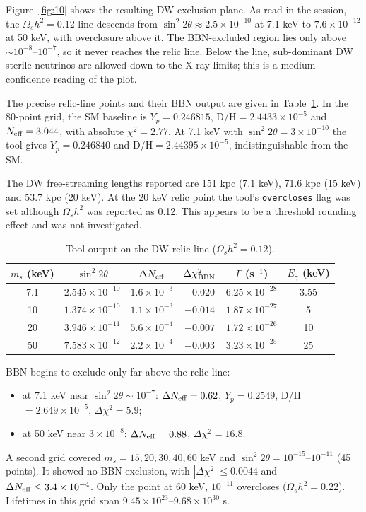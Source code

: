 \documentclass[11pt,a4paper]{article}
\begin{document}
Figure~\ref{fig:10} shows the resulting DW exclusion plane. As read in the session, the $\Omega_s h^2=0.12$ line descends from $\sin^2 2\theta\approx2.5\times10^{-10}$ at 7.1 keV to $7.6\times10^{-12}$ at 50 keV, with overclosure above it. The BBN-excluded region lies only above $\sim10^{-8}$--$10^{-7}$, so it never reaches the relic line. Below the line, sub-dominant DW sterile neutrinos are allowed down to the X-ray limits; this is a medium-confidence reading of the plot.

The precise relic-line points and their BBN output are given in Table~\ref{tab:relic}. In the 80-point grid, the SM baseline is $Y_p=0.246815$, D/H$=2.4433\times10^{-5}$ and $N_{\rm eff}=3.044$, with absolute $\chi^2=2.77$. At 7.1 keV with $\sin^2 2\theta=3\times10^{-10}$ the tool gives $Y_p=0.246840$ and D/H$=2.44395\times10^{-5}$, indistinguishable from the SM.

The DW free-streaming lengths reported are 151 kpc (7.1 keV), 71.6 kpc (15 keV) and 53.7 kpc (20 keV). At the 20 keV relic point the tool's \texttt{overcloses} flag was set although $\Omega_s h^2$ was reported as 0.12. This appears to be a threshold rounding effect and was not investigated.

\begin{table}[h]
\centering
\caption{Tool output on the DW relic line ($\Omega_s h^2=0.12$).}
\label{tab:relic}
\begin{tabular}{cccccc}
\toprule
$m_s$ (keV) & $\sin^2 2\theta$ & $\Delta N_{\rm eff}$ & $\Delta\chi^2_{\rm BBN}$ & $\Gamma$ (s$^{-1}$) & $E_\gamma$ (keV)\\
\midrule
7.1 & $2.545\times10^{-10}$ & $1.6\times10^{-3}$ & $-0.020$ & $6.25\times10^{-28}$ & 3.55\\
10 & $1.374\times10^{-10}$ & $1.1\times10^{-3}$ & $-0.014$ & $1.87\times10^{-27}$ & 5\\
20 & $3.946\times10^{-11}$ & $5.6\times10^{-4}$ & $-0.007$ & $1.72\times10^{-26}$ & 10\\
50 & $7.583\times10^{-12}$ & $2.2\times10^{-4}$ & $-0.003$ & $3.23\times10^{-25}$ & 25\\
\bottomrule
\end{tabular}
\end{table}

BBN begins to exclude only far above the relic line:
\begin{itemize}
\item at 7.1 keV near $\sin^2 2\theta\sim10^{-7}$: $\Delta N_{\rm eff}=0.62$, $Y_p=0.2549$, D/H$=2.649\times10^{-5}$, $\Delta\chi^2=5.9$;
\item at 50 keV near $3\times10^{-8}$: $\Delta N_{\rm eff}=0.88$, $\Delta\chi^2=16.8$.
\end{itemize}
A second grid covered $m_s=15,20,30,40,60$ keV and $\sin^2 2\theta=10^{-15}$--$10^{-11}$ (45 points). It showed no BBN exclusion, with $|\Delta\chi^2|\le0.0044$ and $\Delta N_{\rm eff}\le3.4\times10^{-4}$. Only the point at 60 keV, $10^{-11}$ overcloses ($\Omega_s h^2=0.22$). Lifetimes in this grid span $9.45\times10^{23}$--$9.68\times10^{30}$ s.
\end{document}
